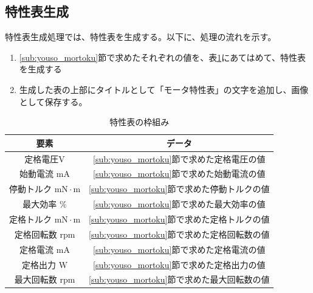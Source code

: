 \subsection{特性表生成}\label{sub:mortortoku}

特性表生成処理では、特性表を生成する。以下に、処理の流れを示す。
\begin{enumerate}
    \item \ref{sub:youso_mortoku}節で求めたそれぞれの値を、表\ref{tab:wakugumi}にあてはめて、特性表を生成する
    \item 生成した表の上部にタイトルとして「モータ特性表」の文字を追加し、画像として保存する。
\end{enumerate}

\begin{table}[t]
	\centering
	\caption{特性表の枠組み}
	\begin{tabular}{|c|c|} \hline
	  要素 & データ \\ \hline \hline
	  定格電圧$\mathrm{V}$ & \ref{sub:youso_mortoku}節で求めた定格電圧の値 \\ \hline
	  始動電流 $\mathrm{mA}$&  \ref{sub:youso_mortoku}節で求めた始動電流の値 \\ \hline
	  停動トルク $\mathrm{mN \cdot m}$& \ref{sub:youso_mortoku}節で求めた停動トルクの値  \\ \hline
      最大効率 $\mathrm{\%}$& \ref{sub:youso_mortoku}節で求めた最大効率の値  \\ \hline
      定格トルク $\mathrm{mN \cdot m}$& \ref{sub:youso_mortoku}節で求めた定格トルクの値 \\ \hline
	  定格回転数 $\mathrm{rpm}$& \ref{sub:youso_mortoku}節で求めた定格回転数の値  \\ \hline
      定格電流 $\mathrm{mA}$& \ref{sub:youso_mortoku}節で求めた定格電流の値  \\ \hline
      定格出力 $\mathrm{W}$& \ref{sub:youso_mortoku}節で求めた定格出力の値 \\ \hline
	  最大回転数 $\mathrm{rpm}$&  \ref{sub:youso_mortoku}節で求めた最大回転数の値 \\ \hline
	\end{tabular}
	\label{tab:wakugumi}
  \end{table}

